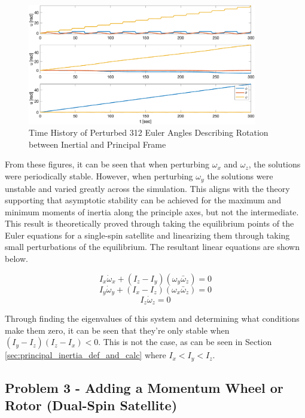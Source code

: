 \begin{figure}[H]
    \centering
    \captionsetup{justification = centering}
    \includegraphics[width = 10cm]{Images/PS4/stability_history_angles.png}
    \caption{Time History of Perturbed 312 Euler Angles Describing Rotation between Inertial and Principal Frame}
    \label{fig:stability_angles}
\end{figure}

From these figures, it can be seen that when perturbing $\omega_x$ and $\omega_z$, the solutions were periodically stable. However, when perturbing $\omega_y$ the solutions were unstable and varied greatly across the simulation. This aligns with the theory supporting that asymptotic stability can be achieved for the maximum and minimum moments of inertia along the principle axes, but not the intermediate. This result is theoretically proved through taking the equilibrium points of the Euler equations for a single-spin satellite and linearizing them through taking small perturbations of the equilibrium. The resultant linear equations are shown below.

\begin{equation}
    I_x \dot \omega_x + (I_z - I_y) (\omega_y \bar{\omega}_z ) = 0
\end{equation}
\begin{equation*}
        I_y \dot \omega_y + (I_x - I_z) (\omega_x \bar{\omega}_z ) = 0
\end{equation*}
\begin{equation*}
        I_z \dot \omega_z = 0
\end{equation*}

Through finding the eigenvalues of this system and determining what conditions make them zero, it can be seen that they're only stable when $(I_y - I_z)(I_z - I_x) < 0$. This is not the case, as can be seen in Section \ref{sec:principal_inertia_def_and_calc} where $I_x < I_y < I_z$.

\subsection{Problem 3 - Adding a Momentum Wheel or Rotor (Dual-Spin Satellite)}

